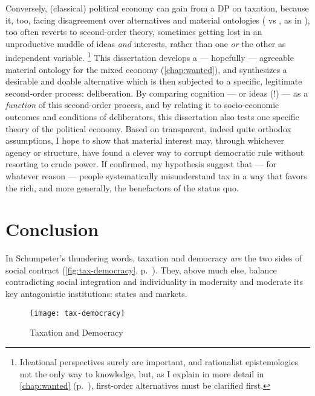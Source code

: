 Conversely, (classical) political economy can gain from a \gls{DP} on taxation, because it, too, facing disagreement over alternatives and material ontologies (\citeauthor{Keynes1936} vs \citeauthor{Hayek1931}, as in \citealt{Wapshott2011}), too often reverts to second-order theory, sometimes getting lost in an unproductive muddle of ideas \emph{and} interests, rather than one \emph{or} the other as independent variable.
\footnote{
	Ideational perspectives surely are important, and rationalist epistemologies not the only way to knowledge, but, as I explain in more detail in \autoref{chap:wanted} (p.~\pageref{chap:wanted}), first-order alternatives must be clarified first.
}
This dissertation develops a --- hopefully --- agreeable material ontology for the mixed economy (\autoref{chap:wanted}), and synthesizes a desirable and doable alternative which is then subjected to a specific, legitimate second-order process:
deliberation.
By comparing cognition --- or ideas (!) --- as a \emph{function} of this second-order process, and by relating it to socio-economic outcomes and conditions of deliberators, this dissertation also tests one specific theory of the political economy.
Based on transparent, indeed quite orthodox assumptions, I hope to show that material interest may, through whichever agency or structure, have found a clever way to corrupt democratic rule without resorting to crude power.
If confirmed, my hypothesis suggest that --- for whatever reason --- people systematically misunderstand tax in a way that favors the rich, and more generally, the benefactors of the status quo.

\section{Conclusion}
In Schumpeter's %
thundering words, taxation and democracy \emph{are} the two sides of social contract (\autoref{fig:tax-democracy}, p.~\pageref{fig:tax-democracy}).
They, above much else, balance contradicting social integration and individuality in modernity and moderate its key antagonistic institutions:
states and markets.

\begin{figure}[htbp]
	\centering
	\texttt{[image: tax-democracy]}
	\caption{Taxation and Democracy}
	\label{fig:tax-democracy}
\end{figure}

